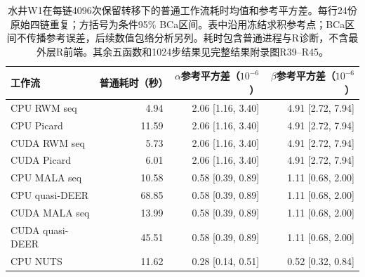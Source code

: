 \begin{table}[htbp]\centering\small
\begin{tabular}{lrrr}\toprule
工作流 & 普通耗时（秒） & $\alpha$参考平方差（$10^{-6}$） & $\beta$参考平方差（$10^{-6}$）\\\midrule
CPU RWM seq & 4.94 & 2.06 [1.16, 3.40] & 4.91 [2.72, 7.94]\\
CPU Picard & 11.59 & 2.06 [1.16, 3.40] & 4.91 [2.72, 7.94]\\
CUDA RWM seq & 5.73 & 2.06 [1.16, 3.40] & 4.91 [2.72, 7.94]\\
CUDA Picard & 6.01 & 2.06 [1.16, 3.40] & 4.91 [2.72, 7.94]\\
CPU MALA seq & 10.58 & 0.58 [0.39, 0.89] & 1.11 [0.68, 2.00]\\
CPU quasi-DEER & 68.85 & 0.58 [0.39, 0.89] & 1.11 [0.68, 2.00]\\
CUDA MALA seq & 13.99 & 0.58 [0.39, 0.89] & 1.11 [0.68, 2.00]\\
CUDA quasi-DEER & 45.51 & 0.58 [0.39, 0.89] & 1.11 [0.68, 2.00]\\
CPU NUTS & 11.62 & 0.28 [0.14, 0.51] & 0.52 [0.32, 0.84]\\
\bottomrule\end{tabular}
\caption{水井W1在每链4096次保留转移下的普通工作流耗时均值和参考平方差。每行24份原始四链重复；方括号为条件95\% BCa区间。表中沿用冻结求积参考点；BCa区间不传播参考误差，后续数值包络分析另列。耗时包含普通进程与R诊断，不含最外层R前端。其余五函数和1024步结果见完整结果附录图R39--R45。}
\label{tab:compact-wells}
\end{table}
